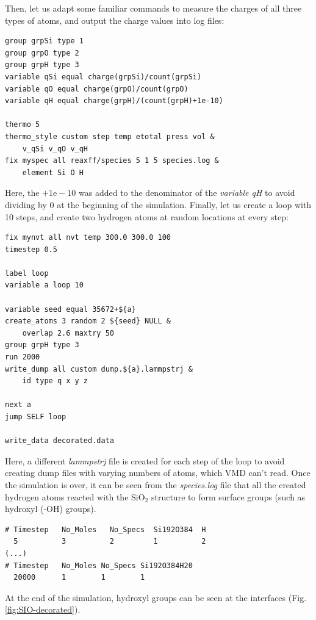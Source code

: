 \documentclass[9pt,tutorial]{livecoms}
\begin{document}
Then, let us adapt some familiar commands to measure the charges of all three types of atoms, and output the charge values into log files:
{\normalsize \begin{verbatim}
group grpSi type 1
group grpO type 2
group grpH type 3
variable qSi equal charge(grpSi)/count(grpSi)
variable qO equal charge(grpO)/count(grpO)
variable qH equal charge(grpH)/(count(grpH)+1e-10)

thermo 5
thermo_style custom step temp etotal press vol &
    v_qSi v_qO v_qH
fix myspec all reaxff/species 5 1 5 species.log &
    element Si O H
\end{verbatim}}
Here, the $+1\text{e}-10$ was added to the denominator of the \textit{variable qH} to avoid dividing by 0 at the beginning of the simulation. Finally, let us create a loop with 10 steps, and create two hydrogen atoms at random locations at every step:
{\normalsize \begin{verbatim}
fix mynvt all nvt temp 300.0 300.0 100
timestep 0.5

label loop
variable a loop 10

variable seed equal 35672+${a}
create_atoms 3 random 2 ${seed} NULL &
    overlap 2.6 maxtry 50
group grpH type 3
run 2000
write_dump all custom dump.${a}.lammpstrj &
    id type q x y z

next a
jump SELF loop

write_data decorated.data
\end{verbatim}}
Here, a different \textit{lammpstrj} file is created for each step of the loop to avoid creating dump files with varying numbers of atoms, which VMD can't read. Once the simulation is over, it can be seen from the \textit{species.log} file that
all the created hydrogen atoms reacted with the $\text{SiO}_{2}$ structure to form surface groups (such as hydroxyl (-OH) groups).
{\normalsize \begin{verbatim}
# Timestep   No_Moles   No_Specs  Si192O384  H
  5          3          2         1          2
(...)
# Timestep   No_Moles No_Specs Si192O384H20
  20000      1        1        1
\end{verbatim}}
At the end of the simulation, hydroxyl groups can be seen at the interfaces (Fig.\,\ref{fig:SIO-decorated}).
\end{document}
